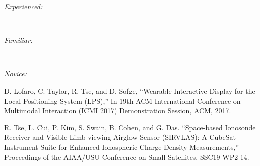\documentclass[10pt,a4paper,ragged2e,withhyper]{altacv}
\begin{document}
\begin{paracol}{2}
    
    

\vspace{-0.25cm}


\textit{Experienced:}

\vspace{0.125cm}

      \\

\divider

\textit{Familiar:}

\vspace{0.125cm}

          \cvtag{\LaTeX} \\

\divider

\textit{Novice:}

\vspace{0.125cm}

   

\vspace{0.25cm}

\renewcommand\refname{\vskip -1cm}


\vspace{-0.25cm}



\begin{thebibliography}{2}
D. Lofaro, C. Taylor, R. Tse, and D. Sofge, “Wearable Interactive Display for the Local Positioning System (LPS),” In 19th ACM International Conference on Multimodal Interaction (ICMI 2017) Demonstration Session, ACM, 2017.

R. Tse, L. Cui, P. Kim, S. Swain, B. Cohen, and G. Das. “Space-based Ionosonde Receiver and Visible Limb-viewing Airglow Sensor (SIRVLAS): A CubeSat Instrument Suite for Enhanced Ionospheric Charge Density Measurements,” Proceedings of the AIAA/USU Conference on Small Satellites, SSC19-WP2-14.
\end{thebibliography}

\end{paracol}
\end{document}
